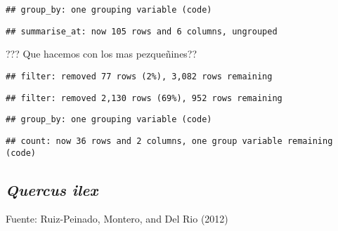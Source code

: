 \documentclass[]{article}
\newenvironment{Shaded}{\begin{snugshade}}{\end{snugshade}}
\newcommand{\DecValTok}[1]{\textcolor[rgb]{0.00,0.00,0.81}{#1}}
\newcommand{\KeywordTok}[1]{\textcolor[rgb]{0.13,0.29,0.53}{\textbf{#1}}}
\newcommand{\NormalTok}[1]{#1}
\newcommand{\OperatorTok}[1]{\textcolor[rgb]{0.81,0.36,0.00}{\textbf{#1}}}
\newcommand{\StringTok}[1]{\textcolor[rgb]{0.31,0.60,0.02}{#1}}
\begin{document}
\begin{verbatim}
## group_by: one grouping variable (code)
\end{verbatim}

\begin{verbatim}
## summarise_at: now 105 rows and 6 columns, ungrouped
\end{verbatim}

??? Que hacemos con los mas pezqueñines??

\begin{Shaded}
\end{Shaded}

\begin{verbatim}
## filter: removed 77 rows (2%), 3,082 rows remaining
\end{verbatim}

\begin{verbatim}
## filter: removed 2,130 rows (69%), 952 rows remaining
\end{verbatim}

\begin{verbatim}
## group_by: one grouping variable (code)
\end{verbatim}

\begin{verbatim}
## count: now 36 rows and 2 columns, one group variable remaining (code)
\end{verbatim}

\hypertarget{quercus-ilex}{%
\subsection{\texorpdfstring{\emph{Quercus
ilex}}{Quercus ilex}}\label{quercus-ilex}}

Fuente: Ruiz-Peinado, Montero, and Del Rio (2012)
\end{document}

